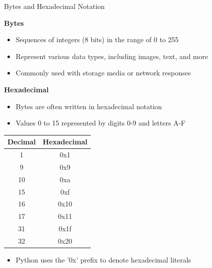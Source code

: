 \documentclass[
	11pt, 
]{beamer}
\begin{document}

\begin{frame}[fragile]{Bytes and Hexadecimal Notation}

\textbf{Bytes}

\begin{itemize}
    \item Sequences of integers (8 bits) in the range of 0 to 255
    \item Represent various data types, including images, text, and more
    \item Commonly used with storage media or network responses
\end{itemize}

\textbf{Hexadecimal}
\begin{itemize}
    \item Bytes are often written in hexadecimal notation
    \item Values 0 to 15 represented by digits 0-9 and letters A-F
\end{itemize}
\begin{table}[]
    \centering
    \tiny
    \begin{tabular}{c|c}
        Decimal & Hexadecimal \\ \hline 
        1 &  0x1\\
        9 & 0x9 \\
        10 & 0xa \\
        15 & 0xf \\
        16 & 0x10 \\
        17 & 0x11 \\
        31 & 0x1f \\
        32 & 0x20 \\
    \end{tabular}
\end{table}
\begin{itemize}
    \item Python uses the '0x' prefix to denote hexadecimal literals
\end{itemize}
\end{frame}

\end{document}
